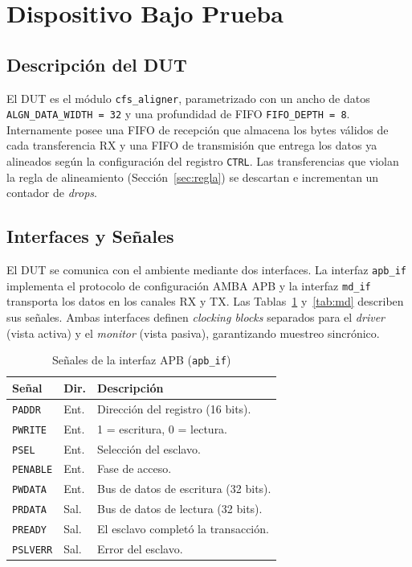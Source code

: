 \documentclass[conference]{IEEEtran}
\begin{document}
\section{Dispositivo Bajo Prueba}

\subsection{Descripción del DUT}
El DUT es el módulo \texttt{cfs\_aligner}, parametrizado con un ancho de datos
\texttt{ALGN\_DATA\_WIDTH = 32} y una profundidad de FIFO
\texttt{FIFO\_DEPTH = 8}. Internamente posee una FIFO de recepción que almacena
los bytes válidos de cada transferencia RX y una FIFO de transmisión que entrega
los datos ya alineados según la configuración del registro \texttt{CTRL}. Las
transferencias que violan la regla de alineamiento
(Sección~\ref{sec:regla}) se descartan e incrementan un contador de
\textit{drops}.

\subsection{Interfaces y Señales}
El DUT se comunica con el ambiente mediante dos interfaces. La interfaz
\texttt{apb\_if} implementa el protocolo de configuración AMBA APB \cite{apb} y
la interfaz \texttt{md\_if} transporta los datos en los canales RX y TX. Las
Tablas~\ref{tab:apb} y~\ref{tab:md} describen sus señales. Ambas interfaces
definen \textit{clocking blocks} separados para el \textit{driver} (vista activa)
y el \textit{monitor} (vista pasiva), garantizando muestreo sincrónico.

\begin{table}[H]
\caption{Señales de la interfaz APB (\texttt{apb\_if})}
\label{tab:apb}
\centering
\footnotesize
\begin{tabular}{@{}llp{4.6cm}@{}}
\toprule
\textbf{Señal} & \textbf{Dir.} & \textbf{Descripción} \\
\midrule
\texttt{PADDR}   & Ent. & Dirección del registro (16 bits). \\
\texttt{PWRITE}  & Ent. & 1 = escritura, 0 = lectura. \\
\texttt{PSEL}    & Ent. & Selección del esclavo. \\
\texttt{PENABLE} & Ent. & Fase de acceso. \\
\texttt{PWDATA}  & Ent. & Bus de datos de escritura (32 bits). \\
\texttt{PRDATA}  & Sal. & Bus de datos de lectura (32 bits). \\
\texttt{PREADY}  & Sal. & El esclavo completó la transacción. \\
\texttt{PSLVERR} & Sal. & Error del esclavo. \\
\bottomrule
\end{tabular}
\end{table}
\end{document}
